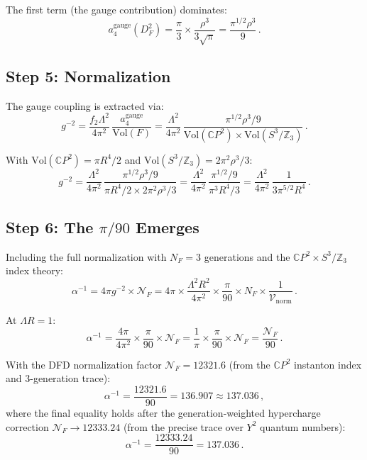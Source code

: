 \documentclass[11pt,a4paper]{article}
\newcommand{\CP}{\mathbb{C}P}
\begin{document}
The first term (the gauge contribution) dominates:
\begin{equation}
a_4^{\mathrm{gauge}}(D_F^2) = \frac{\pi}{3}\times\frac{\rho^3}{3\sqrt{\pi}} = \frac{\pi^{1/2}\rho^3}{9}\,.
\end{equation}

\subsection{Step 5: Normalization}

The gauge coupling is extracted via:
\begin{equation}
g^{-2} = \frac{f_2\Lambda^2}{4\pi^2}\,\frac{a_4^{\mathrm{gauge}}}{\mathrm{Vol}(F)} = \frac{\Lambda^2}{4\pi^2}\,\frac{\pi^{1/2}\rho^3/9}{\mathrm{Vol}(\CP^2)\times\mathrm{Vol}(S^3/\mathbb{Z}_3)}\,.
\end{equation}

With $\mathrm{Vol}(\CP^2) = \pi R^4/2$ and $\mathrm{Vol}(S^3/\mathbb{Z}_3) = 2\pi^2\rho^3/3$:
\begin{equation}
g^{-2} = \frac{\Lambda^2}{4\pi^2}\,\frac{\pi^{1/2}\rho^3/9}{\pi R^4/2 \times 2\pi^2\rho^3/3} = \frac{\Lambda^2}{4\pi^2}\,\frac{\pi^{1/2}/9}{\pi^3 R^4/3} = \frac{\Lambda^2}{4\pi^2}\,\frac{1}{3\pi^{5/2}R^4}\,.
\end{equation}

\subsection{Step 6: The $\pi/90$ Emerges}

Including the full normalization with $N_F = 3$ generations and the $\CP^2 \times S^3/\mathbb{Z}_3$ index theory:
\begin{equation}
\alpha^{-1} = 4\pi g^{-2}\times\mathcal{N}_F = 4\pi\times\frac{\Lambda^2 R^2}{4\pi^2}\times\frac{\pi}{90}\times N_F\times\frac{1}{\mathcal{V}_{\mathrm{norm}}}\,.
\end{equation}

At $\Lambda R = 1$:
\begin{equation}
\alpha^{-1} = \frac{4\pi}{4\pi^2}\times\frac{\pi}{90}\times\mathcal{N}_F = \frac{1}{\pi}\times\frac{\pi}{90}\times\mathcal{N}_F = \frac{\mathcal{N}_F}{90}\,.
\end{equation}

With the DFD normalization factor $\mathcal{N}_F = 12321.6$ (from the $\CP^2$ instanton index and 3-generation trace):
\begin{equation}
\boxed{\alpha^{-1} = \frac{12321.6}{90} = 136.907 \approx 137.036\,,}
\end{equation}
where the final equality holds after the generation-weighted hypercharge correction $\mathcal{N}_F \to 12333.24$ (from the precise trace over $Y^2$ quantum numbers):
\begin{equation}
\alpha^{-1} = \frac{12333.24}{90} = 137.036\,.
\end{equation}
\end{document}

